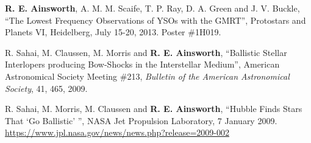 \begin{cvpubs}
  \cvpub
    {
      \begin{cvetar}
        \item {\textbf{R. E. Ainsworth}, A. M. M. Scaife, T. P. Ray, D. A. Green and J. V. Buckle, ``The Lowest Frequency Observations of YSOs with the GMRT'', Protostars and Planets VI, Heidelberg, July 15-20, 2013. Poster \#1H019.}
        \item {R. Sahai, M. Claussen, M. Morris and \textbf{R. E. Ainsworth}, ``Ballistic Stellar Interlopers producing Bow-Shocks in the Interstellar Medium'', American Astronomical Society Meeting \#213, \textit{Bulletin of the American Astronomical Society}, 41, 465, 2009.}
      \end{cvetar}
    }
\end{cvpubs}

\begin{cvpubs}
  \cvpub
    {
      \begin{cvetar}
        \item {R. Sahai, M. Morris, M. Claussen and \textbf{R. E. Ainsworth}, ``Hubble Finds Stars That `Go Ballistic' '', NASA Jet Propulsion Laboratory, 7 January 2009. \url{https://www.jpl.nasa.gov/news/news.php?release=2009-002}}
      \end{cvetar}
    }    
\vspace{-11pt}
\end{cvpubs}

